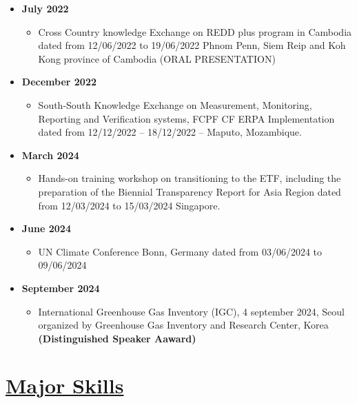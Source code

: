 \documentclass[
]{article}
\providecommand{\tightlist}{%
  \setlength{\itemsep}{0pt}\setlength{\parskip}{0pt}}
\begin{document}
\begin{itemize}
\tightlist
\item
  \textbf{July 2022}

  \begin{itemize}
  \tightlist
  \item
    Cross Country knowledge Exchange on REDD plus program in Cambodia
    dated from 12/06/2022 to 19/06/2022 Phnom Penn, Siem Reip and Koh
    Kong province of Cambodia (ORAL PRESENTATION)
  \end{itemize}
\item
  \textbf{December 2022}

  \begin{itemize}
  \tightlist
  \item
    South-South Knowledge Exchange on Measurement, Monitoring, Reporting
    and Verification systems, FCPF CF ERPA Implementation dated from
    12/12/2022 -- 18/12/2022 -- Maputo, Mozambique.
  \end{itemize}
\item
  \textbf{March 2024}

  \begin{itemize}
  \tightlist
  \item
    Hands-on training workshop on transitioning to the ETF, including
    the preparation of the Biennial Transparency Report for Asia Region
    dated from 12/03/2024 to 15/03/2024 Singapore.
  \end{itemize}
\item
  \textbf{June 2024}

  \begin{itemize}
  \tightlist
  \item
    UN Climate Conference Bonn, Germany dated from 03/06/2024 to
    09/06/2024
  \end{itemize}
\item
  \textbf{September 2024}

  \begin{itemize}
  \tightlist
  \item
    International Greenhouse Gas Inventory (IGC), 4 september 2024,
    Seoul organized by Greenhouse Gas Inventory and Research Center,
    Korea \textbf{(Distinguished Speaker Aaward)}
  \end{itemize}
\end{itemize}

\section{\texorpdfstring{\underline{Major Skills}}{}}\label{section-5}
\end{document}
